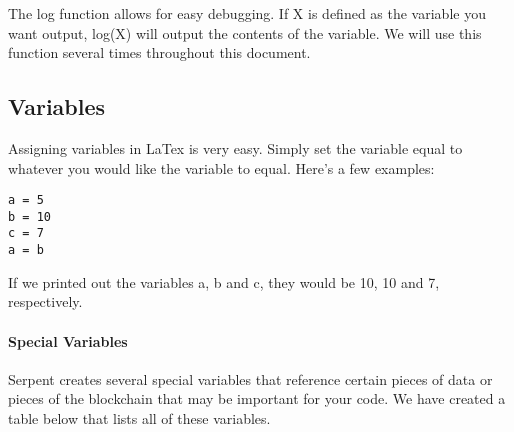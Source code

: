 \documentclass[12pt]{article}
\begin{document}
The log function allows for easy debugging. If X is defined as the variable you want output, log(X) will output the contents of the variable. We will use this function several times throughout this document.


\subsection{Variables}

Assigning variables in LaTex is very easy. Simply set the variable equal to whatever you would like the variable to equal. Here's a few examples:

\begin{lstlisting}
a = 5
b = 10
c = 7
a = b
\end{lstlisting}

If we printed out the variables a, b and c, they would be 10, 10 and 7, respectively. 

\paragraph{Special Variables}

Serpent creates several special variables that reference certain pieces of data or pieces of the blockchain that may be important for your code. We have created a table below that lists all of these variables.
\end{document}
